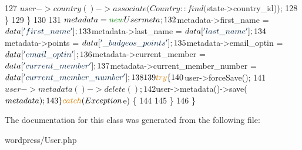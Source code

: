 \begin{DoxyCode}
127                 $user->country()->associate(Country::find($state->country\_id));
128             \}
129         \}
130 
131         $metadata                           = \textcolor{keyword}{new} Usermeta;
132         $metadata->first\_name               = $data[\textcolor{stringliteral}{'first\_name'}];
133         $metadata->last\_name                = $data[\textcolor{stringliteral}{'last\_name'}];
134         $metadata->points                   = $data[\textcolor{stringliteral}{'\_badgeos\_points'}];
135         $metadata->email\_optin              = $data[\textcolor{stringliteral}{'email\_optin'}];
136         $metadata->current\_member           = $data[\textcolor{stringliteral}{'current\_member'}];
137         $metadata->current\_member\_number    = $data[\textcolor{stringliteral}{'current\_member\_number'}];
138 
139         \textcolor{keywordflow}{try} \{
140             $user->forceSave();
141             $user->metadata()->delete();
142             $user->metadata()->save($metadata);
143         \} \textcolor{keywordflow}{catch}(Exception $e) \{
144 
145         \}
146     \}
\end{DoxyCode}


The documentation for this class was generated from the following file\+:\begin{DoxyCompactItemize}
\item 
wordpress/User.\+php\end{DoxyCompactItemize}
